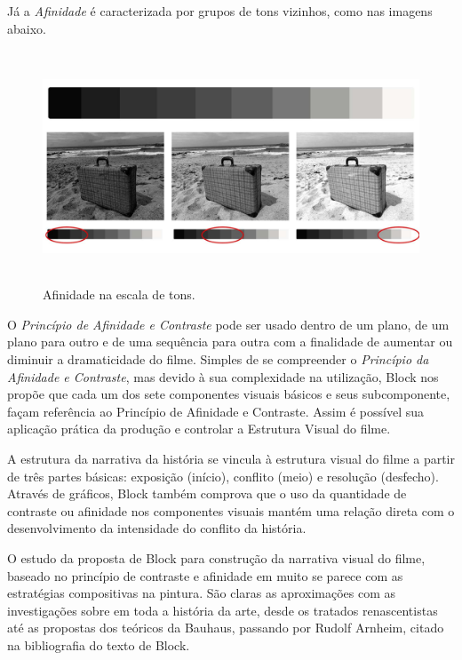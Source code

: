 Já a \emph{Afinidade} é caracterizada por grupos de tons vizinhos, como
nas imagens abaixo.

\begin{figure}
	\caption{Afinidade na escala de tons.}
	\includegraphics[width=5.40139in,height=2.72361in]{figuras/afinidade-escala-tons.pdf.compressed.pdf}
\end{figure}

O \emph{Princípio de Afinidade e Contraste} pode ser usado dentro de um
plano, de um plano para outro e de uma sequência para outra com a
finalidade de aumentar ou diminuir a dramaticidade do filme. Simples de
se compreender o \emph{Princípio da Afinidade e Contraste}, mas devido à sua
complexidade na utilização, Block nos propõe que cada um dos sete
componentes visuais básicos e seus subcomponente, façam referência ao
Princípio de Afinidade e Contraste. Assim é possível sua aplicação
prática da produção e controlar a Estrutura Visual do filme.

A estrutura da narrativa da história se vincula à estrutura visual do
filme a partir de três partes básicas: exposição (início), conflito
(meio) e resolução (desfecho). Através de gráficos, Block também
comprova que o uso da quantidade de contraste ou afinidade nos
componentes visuais mantém uma relação direta com o desenvolvimento da
intensidade do conflito da história.

O estudo da proposta de Block para construção da narrativa visual do
filme, baseado no princípio de contraste e afinidade em muito se parece
com as estratégias compositivas na pintura. São claras as aproximações
com as investigações sobre em toda a história da arte, desde
os tratados renascentistas até as propostas dos teóricos da Bauhaus,
passando por Rudolf Arnheim, citado na bibliografia do texto de Block.


